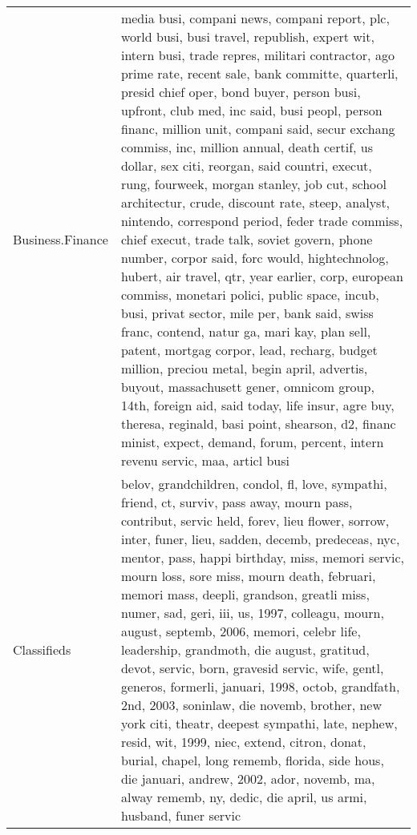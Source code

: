 \begin{longtable}{p{}p{}}
  Business.Finance & media busi, compani news, compani report, plc, world busi, busi travel, republish, expert wit, intern busi, trade repres, militari contractor, ago prime rate, recent sale, bank committe, quarterli, presid chief oper, bond buyer, person busi, upfront, club med, inc said, busi peopl, person financ, million unit, compani said, secur exchang commiss, inc, million annual, death certif, us dollar, sex citi, reorgan, said countri, execut, rung, fourweek, morgan stanley, job cut, school architectur, crude, discount rate, steep, analyst, nintendo, correspond period, feder trade commiss, chief execut, trade talk, soviet govern, phone number, corpor said, forc would, hightechnolog, hubert, air travel, qtr, year earlier, corp, european commiss, monetari polici, public space, incub, busi, privat sector, mile per, bank said, swiss franc, contend, natur ga, mari kay, plan sell, patent, mortgag corpor, lead, recharg, budget million, preciou metal, begin april, advertis, buyout, massachusett gener, omnicom group, 14th, foreign aid, said today, life insur, agre buy, theresa, reginald, basi point, shearson, d2, financ minist, expect, demand, forum, percent, intern revenu servic, maa, articl busi \\ 
  Classifieds & belov, grandchildren, condol, fl, love, sympathi, friend, ct, surviv, pass away, mourn pass, contribut, servic held, forev, lieu flower, sorrow, inter, funer, lieu, sadden, decemb, predeceas, nyc, mentor, pass, happi birthday, miss, memori servic, mourn loss, sore miss, mourn death, februari, memori mass, deepli, grandson, greatli miss, numer, sad, geri, iii, us, 1997, colleagu, mourn, august, septemb, 2006, memori, celebr life, leadership, grandmoth, die august, gratitud, devot, servic, born, gravesid servic, wife, gentl, generos, formerli, januari, 1998, octob, grandfath, 2nd, 2003, soninlaw, die novemb, brother, new york citi, theatr, deepest sympathi, late, nephew, resid, wit, 1999, niec, extend, citron, donat, burial, chapel, long rememb, florida, side hous, die januari, andrew, 2002, ador, novemb, ma, alway rememb, ny, dedic, die april, us armi, husband, funer servic \\ 

\end{longtable}
